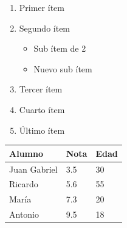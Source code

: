 \documentclass[]{article}
\providecommand{\tightlist}{%
  \setlength{\itemsep}{0pt}\setlength{\parskip}{0pt}}
\begin{document}
\begin{enumerate}
\def\labelenumi{\arabic{enumi}.}
\tightlist
\item
  Primer ítem
\item
  Segundo ítem

  \begin{itemize}
  \tightlist
  \item
    Sub ítem de 2
  \item
    Nuevo sub ítem
  \end{itemize}
\item
  Tercer ítem
\item
  Cuarto ítem
\item
  Último ítem
\end{enumerate}

\begin{longtable}[]{@{}lll@{}}
\toprule
Alumno & Nota & Edad\tabularnewline
\midrule
\endhead
Juan Gabriel & 3.5 & 30\tabularnewline
Ricardo & 5.6 & 55\tabularnewline
María & 7.3 & 20\tabularnewline
Antonio & 9.5 & 18\tabularnewline
\bottomrule
\end{longtable}
\end{document}
